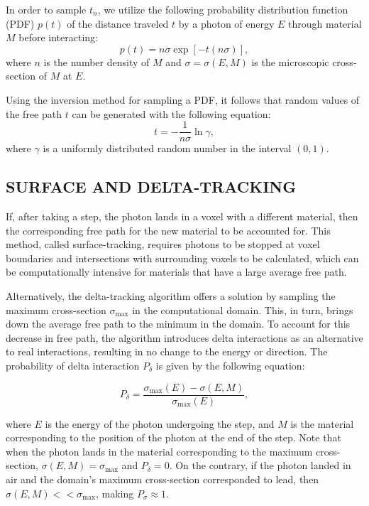 \documentclass[%
 aip,
cp,  %
 amsmath,amssymb,%
reprint,%
]{revtex4-2}
\begin{document}
\par In order to sample $t_n$, we utilize the following probability distribution function (PDF) $p(t)$ of the distance traveled $t$ by a photon of energy $E$ through material $M$ before interacting:
\begin{equation}
p(t) = n\sigma \exp{\left[-t(n\sigma)\right]},
\end{equation}
where $n$ is the number density of $M$ and $\sigma = \sigma(E, M)$ is the microscopic cross-section of $M$ at $E$.
\par Using the inversion method for sampling a PDF, it follows that random values of the free path $t$ can be generated with the following equation:
\begin{equation}
    t = -\frac{1}{n\sigma} \ln \gamma,
\end{equation}
where $\gamma$ is a uniformly distributed random number in the interval $(0, 1)$.
\\

\subsection{SURFACE AND DELTA-TRACKING}

\par If, after taking a step, the photon lands in a voxel with a different material, then the corresponding free path for the new material to be accounted for. This method, called surface-tracking, requires photons to be stopped at voxel boundaries and intersections with surrounding voxels to be calculated, which can be computationally intensive for materials that have a large average free path. 
\par Alternatively, the delta-tracking algorithm offers a solution by sampling the maximum cross-section $\sigma_{\text{max}}$ in the computational domain. This, in turn, brings down the average free path to the minimum in the domain. To account for this decrease in free path, the algorithm introduces delta interactions as an alternative to real interactions, resulting in no change to the energy or direction. The probability of delta interaction $P_{\delta}$ is given by the following equation:

\begin{equation} \label{eq:4}
    P_{\delta} = \frac{\sigma_{\text{max}}(E) - \sigma(E, M)}{\sigma_{\text{max}}(E)},
\end{equation}

where $E$ is the energy of the photon undergoing the step, and $M$ is the material corresponding to the position of the photon at the end of the step. Note that when the photon lands in the material corresponding to the maximum cross-section, $\sigma(E, M) = \sigma_{\text{max}}$ and $P_{\delta} = 0$. On the contrary, if the photon landed in air and the domain's maximum cross-section corresponded to lead, then $\sigma(E, M) << \sigma_{\text{max}}$, making $P_{\sigma} \approx 1$.
\end{document}
